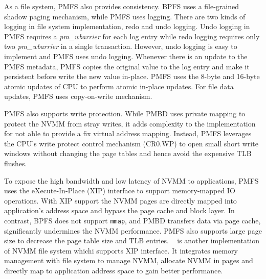 As a file system, PMFS also provides consistency. BPFS uses a file-grained
shadow paging mechanism, while PMFS uses logging. There are two kinds of logging
in file system implementation, redo and undo logging. Undo logging in PMFS
requires a \emph{pm\_wbarrier} for each log entry while redo logging requires
only two \emph{pm\_wbarrier} in a single transaction. However, undo logging
is easy to implement and PMFS uses undo logging. Whenever there is an update
to the PMFS metadata, PMFS copies the original value to the log entry and
make it persistent before write the new value in-place. PMFS uses the
8-byte and 16-byte atomic updates of CPU to perform atomic in-place updates.
For file data updates, PMFS uses copy-on-write mechanism.

PMFS also supports write protection. While PMBD uses private mapping to
protect the NVMM from stray writes, it adds complexity to the implementation
for not able to provide a fix virtual address mapping. Instead, PMFS leverages
the CPU's write protect control mechanism (CR0.WP) to open small short write
windows without changing the page tables and hence avoid the expensive
TLB flushes.

To expose the high bandwidth and low latency of NVMM to applications,
PMFS uses the eXecute-In-Place (XIP) interface to support memory-mapped
IO operations. With XIP support the NVMM pages are directly mapped into
application's address space and bypass the page cache and block layer.
In contrast, BPFS does not support \texttt{mmap}, and PMBD transfers
data via page cache, significantly undermines the NVMM performance.
PMFS also supports large page size to decrease the page table size and
TLB entries. ~\cite{mmfs} is another implementation of NVMM file system
whichi supports XIP interface. It integrates memory management with file system
to manage NVMM, allocate NVMM in pages and directly map to application
address space to gain better performance.
